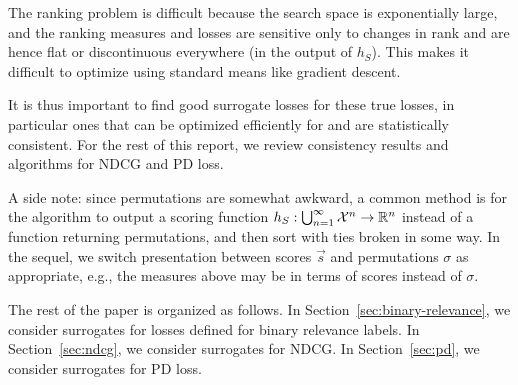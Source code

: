 The ranking problem is difficult because the search
space is exponentially large, and the ranking measures and losses are
sensitive only to changes in rank and are hence flat or discontinuous
everywhere (in the output of $h_S$). This makes it difficult to optimize
using standard means like gradient descent. 

It is thus important to find good surrogate losses for these true losses, in
particular ones that can be optimized efficiently for and are statistically
consistent. For the rest of this report, we review consistency results and
algorithms for NDCG and PD loss. 

A side note: since permutations are somewhat awkward, a common method is for
the algorithm to output a scoring function  
$h_S: \bigcup_{n=1}^\infty {\mathcal X}^n \to \mathbb{R}^n$ instead of a function returning
permutations, and then sort with ties broken in some way. In the sequel,
we switch presentation between scores $\vec{s}$ and permutations $\sigma$
as appropriate, e.g., the measures above may be in terms of scores
instead of $\sigma$.

% 
% 
% 

The rest of the paper is organized as follows.
In Section~\ref{sec:binary-relevance}, we consider surrogates for losses
defined for binary relevance labels.
In Section~\ref{sec:ndcg}, we consider surrogates for NDCG.
In Section~\ref{sec:pd}, we consider surrogates for PD loss.
